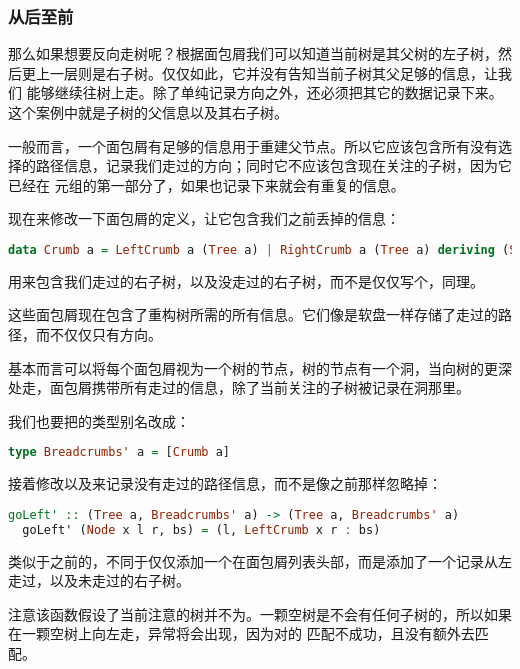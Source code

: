 \documentclass[./main.tex]{subfiles}
\begin{document}
\subsubsection*{从后至前}

那么如果想要反向走树呢？根据面包屑我们可以知道当前树是其父树的左子树，然后更上一层则是右子树。仅仅如此，它并没有告知当前子树其父足够的信息，让我们
能够继续往树上走。除了单纯记录方向之外，还必须把其它的数据记录下来。这个案例中就是子树的父信息以及其右子树。

一般而言，一个面包屑有足够的信息用于重建父节点。所以它应该包含所有没有选择的路径信息，记录我们走过的方向；同时它不应该包含现在关注的子树，因为它已经在
元组的第一部分了，如果也记录下来就会有重复的信息。

现在来修改一下面包屑的定义，让它包含我们之前丢掉的信息：

\begin{lstlisting}[language=Haskell]
  data Crumb a = LeftCrumb a (Tree a) | RightCrumb a (Tree a) deriving (Show)
\end{lstlisting}

用来包含我们走过的右子树，以及没走过的右子树，而不是仅仅写个，同理。

这些面包屑现在包含了重构树所需的所有信息。它们像是软盘一样存储了走过的路径，而不仅仅只有方向。

基本而言可以将每个面包屑视为一个树的节点，树的节点有一个洞，当向树的更深处走，面包屑携带所有走过的信息，除了当前关注的子树被记录在洞那里。

我们也要把的类型别名改成：

\begin{lstlisting}[language=Haskell]
  type Breadcrumbs' a = [Crumb a]
\end{lstlisting}

接着修改以及来记录没有走过的路径信息，而不是像之前那样忽略掉：

\begin{lstlisting}[language=Haskell]
  goLeft' :: (Tree a, Breadcrumbs' a) -> (Tree a, Breadcrumbs' a)
  goLeft' (Node x l r, bs) = (l, LeftCrumb x r : bs)
\end{lstlisting}

类似于之前的，不同于仅仅添加一个在面包屑列表头部，而是添加了一个记录从左走过，以及未走过的右子树。

注意该函数假设了当前注意的树并不为。一颗空树是不会有任何子树的，所以如果在一颗空树上向左走，异常将会出现，因为对的
匹配不成功，且没有额外去匹配。
\end{document}
